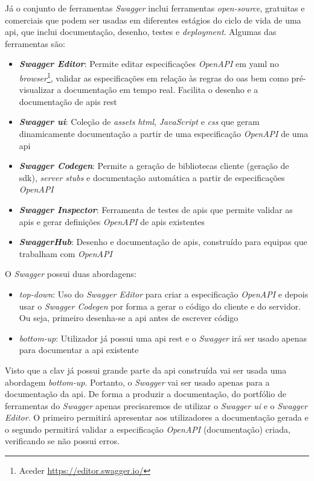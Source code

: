 Já o conjunto de ferramentas \textit{Swagger} inclui ferramentas \textit{open-source}, gratuitas e comerciais que podem ser usadas em diferentes estágios do ciclo de vida de uma \acrshort{api}, que inclui documentação, desenho, testes e \textit{deployment}. Algumas das ferramentas são:~\cite{swaggerVSoas}
\begin{itemize}
    \item \textbf{\textit{Swagger Editor}}: Permite editar especificações \textit{OpenAPI} em \acrshort{yaml} no \textit{browser}\footnote{Aceder \url{https://editor.swagger.io/}}, validar as especificações em relação às regras do \acrshort{oas} bem como pré-visualizar a documentação em tempo real. Facilita o desenho e a documentação de \acrshort{api}s \acrshort{rest}
    \item \textbf{\textit{Swagger \acrshort{ui}}}: Coleção de \textit{assets} \textit{\acrshort{html}}, \textit{JavaScript} e \textit{\acrshort{css}} que geram dinamicamente documentação a partir de uma especificação \textit{OpenAPI} de uma \acrshort{api}
    \item \textbf{\textit{Swagger Codegen}}: Permite a geração de bibliotecas cliente (geração de \acrshort{sdk}), \textit{server stubs} e documentação automática a partir de especificações \textit{OpenAPI}
    \item \textbf{\textit{Swagger Inspector}}: Ferramenta de testes de \acrshort{api}s que permite validar as \acrshort{api}s e gerar definições \textit{OpenAPI} de \acrshort{api}s existentes
    \item \textbf{\textit{SwaggerHub}}: Desenho e documentação de \acrshort{api}s, construído para equipas que trabalham com \textit{OpenAPI}
\end{itemize}

O \textit{Swagger} possui duas abordagens:~\cite{swaggerNode}
\begin{itemize}
    \item \textit{top-down}: Uso do \textit{Swagger Editor} para criar a especificação \textit{OpenAPI} e depois usar o \textit{Swagger Codegen} por forma a gerar o código do cliente e do servidor. Ou seja, primeiro desenha-se a \acrshort{api} antes de escrever código
    \item \textit{bottom-up}: Utilizador já possui uma \acrshort{api} \acrshort{rest} e o \textit{Swagger} irá ser usado apenas para documentar a \acrshort{api} existente
\end{itemize}

Visto que a \acrshort{clav} já possui grande parte da \acrshort{api} construída vai ser usada uma abordagem \textit{bottom-up}. Portanto, o \textit{Swagger} vai ser usado apenas para a documentação da \acrshort{api}. De forma a produzir a documentação, do portfólio de ferramentas do \textit{Swagger} apenas precisaremos de utilizar o \textit{Swagger \acrshort{ui}} e o \textit{Swagger Editor}. O primeiro permitirá apresentar aos utilizadores a documentação gerada e o segundo permitirá validar a especificação \textit{OpenAPI} (documentação) criada, verificando se não possui erros.

